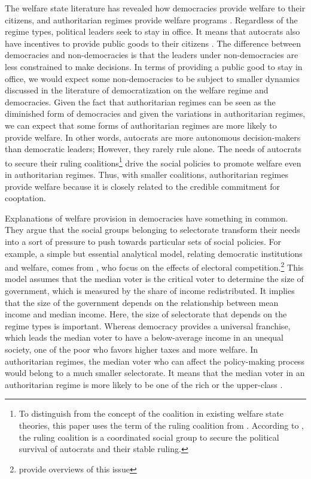\documentclass[11pt]{article}
\begin{document}
The welfare state literature has revealed how democracies provide welfare to their citizens, and authoritarian regimes provide welfare programs \citep{Tang2000, Kwon2005a, Orenstein2008, Bader2015, Ong2015, Morgenbesser2017}. Regardless of the regime types, political leaders seek to stay in office. It means that autocrats also have incentives to provide public goods to their citizens \citep{Wintrobe1998}. The difference between democracies and non-democracies is that the leaders under non-democracies are less constrained to make decisions. In terms of providing a public good to stay in office, we would expect some non-democracies to be subject to smaller dynamics discussed in the literature of democratization on the welfare regime and democracies. Given the fact that authoritarian regimes can be seen as the diminished form of democracies and given the variations in authoritarian regimes, we can expect that some forms of authoritarian regimes are more likely to provide welfare. In other words, autocrats are more autonomous decision-makers than democratic leaders; However, they rarely rule alone. The needs of autocrats to secure their ruling coalitions\footnote{To distinguish from the concept of the coalition in existing welfare state theories, this paper uses the term of the ruling coalition from \citet{Svolik2012}. According to \citet{Svolik2012}, the ruling coalition is a coordinated social group to secure the political survival of autocrats and their stable ruling.} drive the social policies to promote welfare even in authoritarian regimes. Thus, with smaller coalitions, authoritarian regimes provide welfare because it is closely related to the credible commitment for cooptation.

Explanations of welfare provision in democracies have something in common. They argue that the social groups belonging to selectorate transform their needs into a sort of pressure to push towards particular sets of social policies. For example, a simple but essential analytical model, relating democratic institutions and welfare, comes from \citet{Meltzer1981}, who focus on the effects of electoral competition.\footnote{\citet{Boix2003} provide overviews of this issue} This model assumes that the median voter is the critical voter to determine the size of government, which is measured by the share of income redistributed. It implies that the size of the government depends on the relationship between mean income and median income. Here, the size of selectorate that depends on the regime types is important. Whereas democracy provides a universal franchise, which leads the median voter to have a below-average income in an unequal society, one of the poor who favors higher taxes and more welfare. In authoritarian regimes, the median voter who can affect the policy-making process would belong to a much smaller selectorate. It means that the median voter in an authoritarian regime is more likely to be one of the rich or the upper-class \citep[2]{Yi2014}.\par
\end{document}
